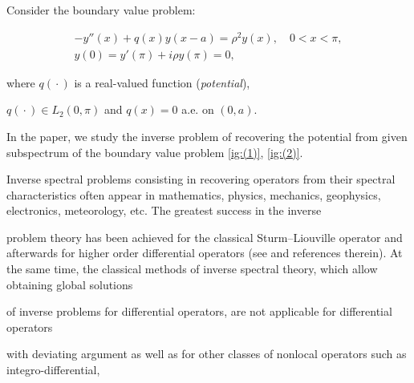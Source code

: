 


\vspace{-3mm}



\makeentitle













Consider the boundary value problem:

\begin{gather}

-y''(x)+q(x)y(x-a)=\rho^2 y(x), \quad 0<x<\pi,           

\label{ig:(1)}

\\

y(0)=y'(\pi)+i\rho y(\pi)=0, 

\label{ig:(2)}

\end{gather}

where  $q({}\cdot{})$ is a real-valued function ({\it potential}\/),

$q({}\cdot{})\in L_2(0,\pi)$ and $q(x)=0$ a.e. on $(0,a)$. 

In the paper, we study the inverse problem of recovering the potential from given subspectrum of the boundary value problem \eqref{ig:(1)}, \eqref{ig:(2)}. 

Inverse spectral problems consisting in recovering operators from their spectral characteristics often appear in mathematics, physics, mechanics, geophysics, electronics, meteorology, etc. The greatest success in the inverse

problem theory has been achieved for the classical Sturm–Liouville operator and afterwards for higher order differential operators (see \cite{ign:1, ign:2, ign:3, ign:4}  and references therein). At the same time, the classical methods of inverse spectral theory, which allow obtaining global solutions

of inverse problems for differential operators, are not applicable for differential operators

with deviating argument as well as for other classes of nonlocal operators such as integro-differential,

